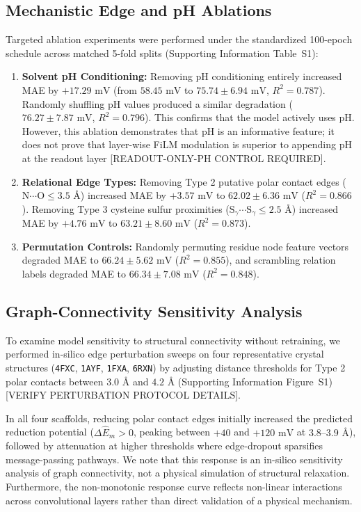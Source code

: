 \documentclass[journal=jcisd8,manuscript=article]{achemso}
\begin{document}
\subsection{Mechanistic Edge and pH Ablations}
Targeted ablation experiments were performed under the standardized 100-epoch schedule across matched 5-fold splits (Supporting Information Table~S1):
\begin{enumerate}
    \item \textbf{Solvent pH Conditioning:} Removing pH conditioning entirely increased MAE by $+17.29\text{ mV}$ (from $58.45\text{ mV}$ to $75.74 \pm 6.94\text{ mV}$, $R^2 = 0.787$). Randomly shuffling pH values produced a similar degradation ($76.27 \pm 7.87\text{ mV}$, $R^2 = 0.796$). This confirms that the model actively uses pH. However, this ablation demonstrates that pH is an informative feature; it does not prove that layer-wise FiLM modulation is superior to appending pH at the readout layer [READOUT-ONLY-PH CONTROL REQUIRED].
    \item \textbf{Relational Edge Types:} Removing Type 2 putative polar contact edges ($\text{N}\cdots\text{O} \le 3.5\text{ \AA}$) increased MAE by $+3.57\text{ mV}$ to $62.02 \pm 6.36\text{ mV}$ ($R^2 = 0.866$). Removing Type 3 cysteine sulfur proximities ($\text{S}_\gamma\cdots\text{S}_\gamma \le 2.5\text{ \AA}$) increased MAE by $+4.76\text{ mV}$ to $63.21 \pm 8.60\text{ mV}$ ($R^2 = 0.873$).
    \item \textbf{Permutation Controls:} Randomly permuting residue node feature vectors degraded MAE to $66.24 \pm 5.62\text{ mV}$ ($R^2 = 0.855$), and scrambling relation labels degraded MAE to $66.34 \pm 7.08\text{ mV}$ ($R^2 = 0.848$).
\end{enumerate}

\subsection{Graph-Connectivity Sensitivity Analysis}
To examine model sensitivity to structural connectivity without retraining, we performed in-silico edge perturbation sweeps on four representative crystal structures (\texttt{4FXC}, \texttt{1AYF}, \texttt{1FXA}, \texttt{6RXN}) by adjusting distance thresholds for Type 2 polar contacts between $3.0\text{ \AA}$ and $4.2\text{ \AA}$ (Supporting Information Figure~S1) [VERIFY PERTURBATION PROTOCOL DETAILS].

In all four scaffolds, reducing polar contact edges initially increased the predicted reduction potential ($\Delta \widehat{E}_m > 0$, peaking between $+40$ and $+120\text{ mV}$ at $3.8\text{--}3.9\text{ \AA}$), followed by attenuation at higher thresholds where edge-dropout sparsifies message-passing pathways. We note that this response is an in-silico sensitivity analysis of graph connectivity, not a physical simulation of structural relaxation. Furthermore, the non-monotonic response curve reflects non-linear interactions across convolutional layers rather than direct validation of a physical mechanism.
\end{document}
